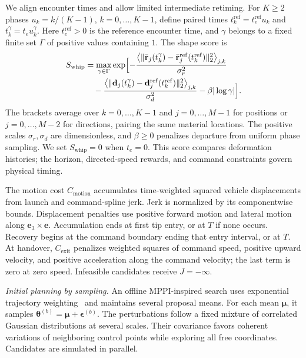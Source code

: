 We align encounter times and allow limited intermediate retiming.
For $K\geq2$ phases $u_k=k/(K-1)$, $k=0,\ldots,K-1$,
define paired times $t_k^{\mathrm{ref}}=t_e^{\mathrm{ref}}u_k$
and $t_k^\gamma=t_eu_k^\gamma$. Here $t_e^{\mathrm{ref}}>0$ is the
reference encounter time, and $\gamma$ belongs to a fixed finite
set $\Gamma$ of positive values containing $1$.
The shape score is
\begin{equation}
\begin{aligned}
S_{\mathrm{whip}}&=\max_{\gamma\in\Gamma}\exp\Bigl[
-\frac{\bigl\langle\|\bar{\mathbf r}_j(t_k^\gamma)
-\bar{\mathbf r}_j^{\mathrm{ref}}(t_k^{\mathrm{ref}})\|_2^2\bigr\rangle_{j,k}}{\sigma_r^2}\\
&\quad-\frac{\bigl\langle\|\mathbf d_j(t_k^\gamma)
-\mathbf d_j^{\mathrm{ref}}(t_k^{\mathrm{ref}})\|_2^2\bigr\rangle_{j,k}}{\sigma_d^2}
-\beta|\log\gamma|\Bigr].
\end{aligned}
\label{eq:whip_similarity}
\end{equation}
The brackets average over $k=0,\ldots,K-1$ and
$j=0,\ldots,M-1$ for positions or $j=0,\ldots,M-2$ for
directions, pairing the same material locations. The positive
scales $\sigma_r,\sigma_d$ are dimensionless, and $\beta\geq0$
penalizes departure from uniform phase sampling. We set
$S_{\mathrm{whip}}=0$ when $t_e=0$.
This score compares deformation histories; the horizon,
directed-speed rewards, and command constraints govern physical timing.

The motion cost $C_{\mathrm{motion}}$ accumulates time-weighted
squared vehicle displacements from launch and command-spline jerk.
Jerk is normalized by its componentwise bounds. Displacement penalties use
positive forward motion and lateral motion along
$\mathbf e_3\times\mathbf e$. Accumulation ends at first tip
entry, or at $T$ if none occurs. Recovery begins at the command
boundary ending that entry interval, or at $T$.
At handover, $C_{\mathrm{exit}}$ penalizes weighted squares of
command speed, positive upward velocity, and positive acceleration
along the command velocity; the last term is zero at zero speed.
Infeasible candidates receive $J=-\infty$.

\noindent\emph{Initial planning by sampling.}
An offline MPPI-inspired search uses exponential trajectory
weighting~\cite{williams2017model} and maintains several proposal
means. For each mean $\boldsymbol\mu$, it samples
$\boldsymbol\theta^{(b)}=\boldsymbol\mu+\boldsymbol\epsilon^{(b)}$.
The perturbations follow a fixed mixture of correlated Gaussian
distributions at several scales. Their covariance favors coherent
variations of neighboring control points while exploring all
free coordinates. Candidates are simulated in parallel.

